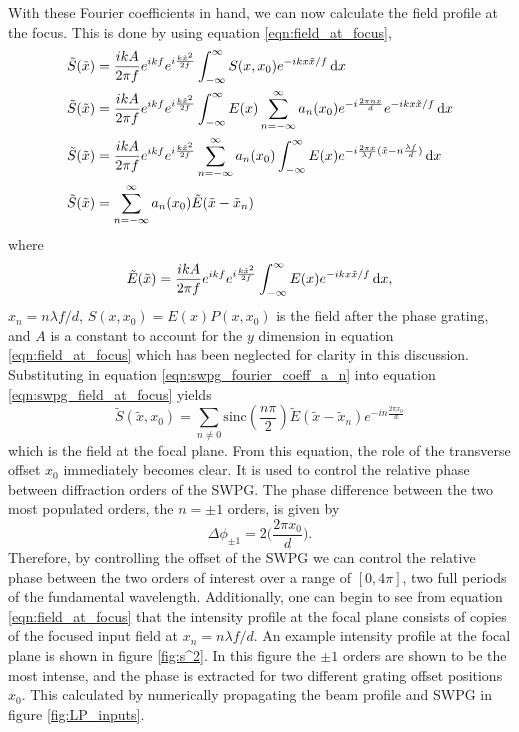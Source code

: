 With these Fourier coefficients in hand, we can now calculate the field profile at the focus.  This is done by using equation \ref{eqn:field_at_focus},
\begin{equation}
\label{eqn:swpg_field_at_focus}
	\begin{aligned}
		\tilde{S}(\tilde{x}) &= \frac{i k A}{2\pi f}e^{ikf}e^{i\frac{k\tilde{x}^2}{2f}}\int_{-\infty}^{\infty}S(x,x_0)e^{-ikx\tilde{x}/f}\mathop{}\!\mathrm{d} x\\
		\tilde{S}(\tilde{x}) &= \frac{i k A}{2\pi f}e^{ikf}e^{i\frac{k\tilde{x}^2}{2f}}\int_{-\infty}^{\infty} E(x) \sum_{n=-\infty}^{\infty}a_n(x_0)e^{-i\frac{2\pi nx}{d}} e^{-ikx\tilde{x}/f}\mathop{}\!\mathrm{d} x\\
		\tilde{S}(\tilde{x}) &= \frac{i k A}{2\pi f}e^{ikf}e^{i\frac{k\tilde{x}^2}{2f}}\sum_{n=-\infty}^{\infty}a_n(x_0) \int_{-\infty}^{\infty} E(x) e^{-i\frac{2\pi x}{\lambda f}(\tilde{x} - n\frac{\lambda f}{d})}\mathop{}\!\mathrm{d} x\\
		\tilde{S}(\tilde{x}) &= \sum_{n=-\infty}^{\infty} a_n(x_0) \tilde{E}(\tilde{x} - \tilde{x}_n)
	\end{aligned}
\end{equation}
where
\begin{equation}
	\tilde{E}(\tilde{x}) = \frac{i k A}{2\pi f}e^{ikf}e^{i\frac{k\tilde{x}^2}{2f}} \int_{-\infty}^{\infty}E(x)e^{-ikx\tilde{x}/f}\mathop{}\!\mathrm{d} x,
\end{equation}
$x_n=n\lambda f/d$, $S(x,x_0)=E(x)P(x,x_0)$ is the field after the phase grating, and $A$ is a constant to account for the $y$ dimension in equation \ref{eqn:field_at_focus} which has been neglected for clarity in this discussion.  Substituting in equation \ref{eqn:swpg_fourier_coeff_a_n} into equation \ref{eqn:swpg_field_at_focus} yields
\begin{equation}
\label{eqn:swpg_field_at_focus_simple}
	\tilde{S}(\tilde{x}, x_0)=\sum_{n\neq 0}\mathrm{sinc}(\frac{n\pi}{2})\tilde{E}(\tilde{x}-\tilde{x}_n)e^{-in\frac{2\pi x_0}{d}}
\end{equation}
which is the field at the focal plane. From this equation, the role of the transverse offset $x_0$ immediately becomes clear.  It is used to control the relative phase between diffraction orders of the SWPG.  The phase difference between the two most populated orders, the $n=\pm 1$ orders, is given by
\begin{equation}
\label{eqn:phase_diff}
	\Delta\phi_{\pm 1}=2\bigg(\frac{2\pi x_0}{d}\bigg).
\end{equation}
Therefore, by controlling the offset of the SWPG we can control the relative phase between the two orders of interest over a range of $[0,4\pi]$, two full periods of the fundamental wavelength.  Additionally, one can begin to see from equation \ref{eqn:field_at_focus} that the intensity profile at the focal plane consists of copies of the focused input field at $x_n = n\lambda f/d$.  An example intensity profile at the focal plane is shown in figure \ref{fig:s^2}. In this figure the $\pm1$ orders are shown to be the most intense, and the phase is extracted for two different grating offset positions $x_0$.  This calculated by numerically propagating the beam profile and SWPG in figure \ref{fig:LP_inputs}.
